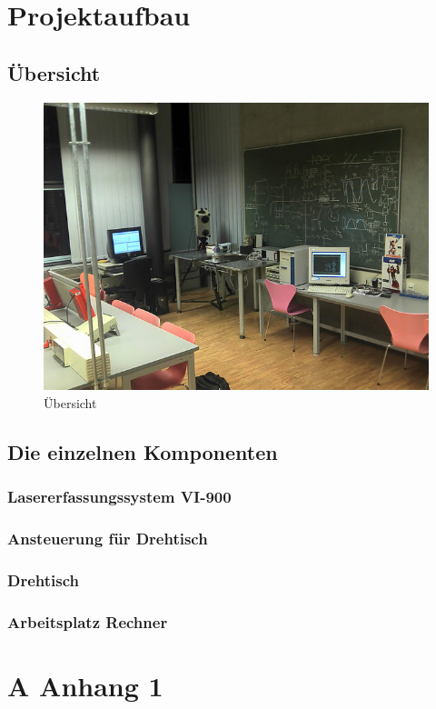 \documentclass[11pt]{article}
\begin{document}
\section{Projektaufbau}
\subsection{Übersicht}
\begin{figure}[hp]
	\centering
	\includegraphics[width=16cm]{./_Res/Uebersicht.jpg}
	\caption{Übersicht}
\end{figure}
\subsection{Die einzelnen Komponenten}
\subsubsection{Lasererfassungssystem VI-900}
\subsubsection{Ansteuerung für Drehtisch}
\subsubsection{Drehtisch}
\subsubsection{Arbeitsplatz Rechner}
\newpage

\section*{A Anhang 1}
\newpage
\end{document}
